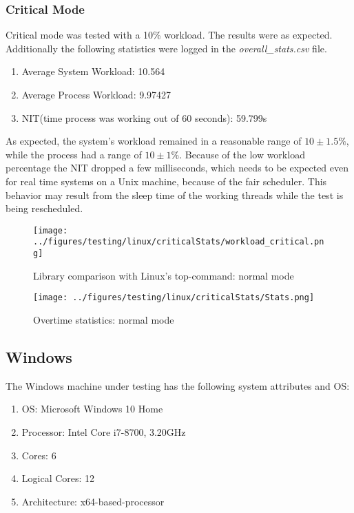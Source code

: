 \newpage
\subsubsection{Critical Mode}
Critical mode was tested with a 10\% workload. The results were as expected. Additionally the following statistics were logged in the \textit{overall\_stats.csv} file.
\begin{enumerate}
	\item Average System Workload: 10.564
	\item Average Process Workload: 9.97427
	\item NIT(time process was working out of 60 seconds): 59.799s
\end{enumerate}
As expected, the system's workload remained in a reasonable range of $10 \pm 1.5\%$, while the process had a range of $10 \pm 1\%$. Because of the low workload percentage the NIT dropped a few milliseconds, which needs to be expected even for real time systems on a Unix machine, because of the fair scheduler. This behavior may result from the sleep time of the working threads while the test is being rescheduled.
\begin{figure}[!htbp]
	\centering
	\begin{minipage}[b]{\textwidth}
		\centering
		\texttt{[image: ../figures/testing/linux/criticalStats/workload\_critical.png]}
		\caption{Library comparison with Linux's top-command: normal mode}
		\hspace{3mm}
	\end{minipage}
	\begin{minipage}[b]{\textwidth}
		\centering
		\texttt{[image: ../figures/testing/linux/criticalStats/Stats.png]}
		\caption{Overtime statistics: normal mode}
	\end{minipage}
\end{figure}
\newpage
\subsection{Windows}
The Windows machine under testing has the following system attributes and OS:
\begin{enumerate}
	\item OS: Microsoft Windows 10 Home
	\item Processor: Intel Core i7-8700, 3.20GHz
	\item Cores: 6
	\item Logical Cores: 12
	\item Architecture: x64-based-processor
\end{enumerate}

